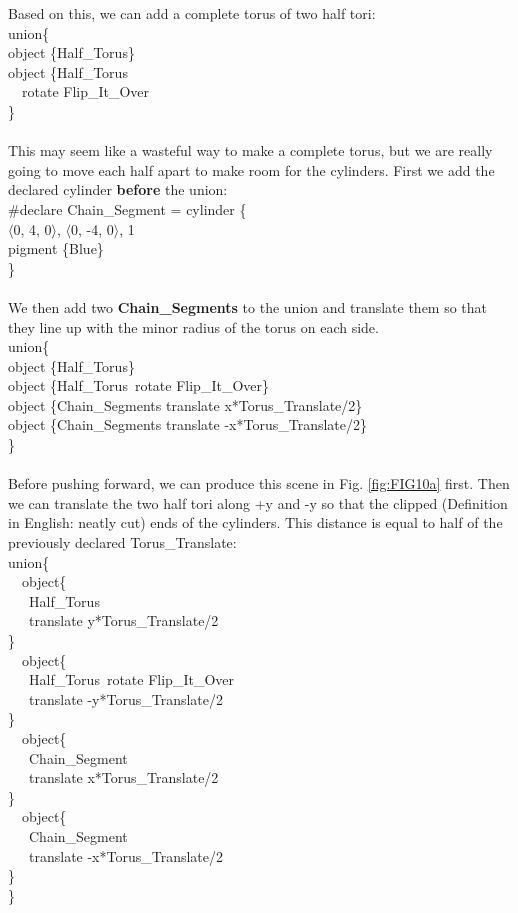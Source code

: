 \documentclass[fleqn,10pt]{wlscirep}
\newcommand*{\DF}{Definition in English}
\begin{document}
Based on this, we can add a complete torus of two half tori:\\
{\color{blue}
union\{ \\
object \{Half\_Torus\}  \\
object \{Half\_Torus  \\
\ \ rotate Flip\_It\_Over \\
\} \\
}\\
This may seem like a wasteful way to make a complete torus, but we are really going to move each half apart to make room for the cylinders. First we add the declared cylinder \textbf{before} the union:\\
{\color{blue}
\#declare Chain\_Segment = cylinder \{  \\
 $\langle$0, 4, 0$\rangle$,  $\langle$0, -4, 0$\rangle$, 1\\
 pigment \{Blue\}  \\
\}  \\
}\\
\newline
We then add two \textbf{Chain\_Segments} to the union and translate them so that they line up with the minor radius of the torus on each side.\\
{\color{blue}
union\{ \\
 object \{Half\_Torus\}  \\
 object \{Half\_Torus\ rotate Flip\_It\_Over\}  \\
 object \{Chain\_Segments translate x*Torus\_Translate/2\}  \\
 object \{Chain\_Segments translate -x*Torus\_Translate/2\}  \\
\}  \\
}\\
Before pushing forward, we can produce this scene in Fig. \ref{fig:FIG10a} first. Then we can translate the two half tori along +y and -y so that the clipped (\DF: neatly cut) ends of the cylinders. This distance is equal to half of the previously declared Torus\_Translate:\\
{\color{blue}
union\{  \\
\ \ object\{  \\
\ \ \ Half\_Torus  \\
\ \ \ translate y*Torus\_Translate/2  \\
\}  \\
\ \ object\{  \\
\ \ \ Half\_Torus\ rotate Flip\_It\_Over  \\
\ \ \ translate -y*Torus\_Translate/2  \\
\}  \\
\ \ object\{  \\
\ \ \ Chain\_Segment  \\
\ \ \ translate x*Torus\_Translate/2 \\
\}  \\
\ \ object\{  \\
\ \ \ Chain\_Segment  \\
\ \ \ translate -x*Torus\_Translate/2  \\
\}\\
\}\\
}\\
\end{document}
